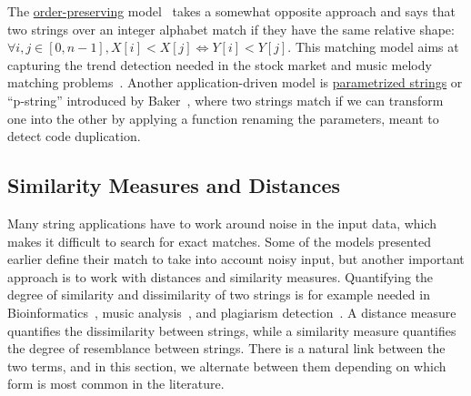 The \underline{order-preserving} model~\cite{kim2014order,kubica2013linear} takes a somewhat opposite approach and says that two strings over an integer alphabet match if they have the same relative shape: $\forall i,j \in [0,n-1], X[i] < X[j] \Leftrightarrow Y[i] < Y[j]$. This matching model aims at capturing the trend detection needed in the stock market and music melody matching problems~\cite{kim2014order}.
%
Another application-driven model is \underline{parametrized strings} or ``p-string'' introduced by Baker~\cite{baker1993theory}, where two strings match if we can transform one into the other by applying a function renaming the parameters, meant to detect code duplication.


\subsection{Similarity Measures and Distances}
Many string applications have to work around noise in the input data, which makes it difficult to search for exact matches. Some of the models presented earlier define their match to take into account noisy input, but another important approach is to work with distances and similarity measures. Quantifying the degree of similarity and dissimilarity of two strings is for example needed in Bioinformatics~\cite{Gusfield1997}, music analysis~\cite{Mongeau1990}, and plagiarism detection~\cite{lukashenko2007computer}. 
%
A distance measure quantifies the dissimilarity between strings, while a similarity measure quantifies the degree of resemblance between strings. There is a natural link between the two terms, and in this section, we alternate between them depending on which form is most common in the literature.

